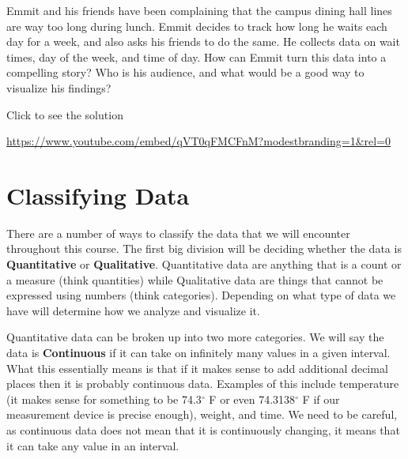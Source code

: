 \documentclass[
  letterpaper,
  DIV=11,
  numbers=noendperiod]{scrreprt}
\begin{document}
\begin{tcolorbox}[enhanced jigsaw, leftrule=.75mm, arc=.35mm, coltitle=black, rightrule=.15mm, bottomrule=.15mm, toprule=.15mm, left=2mm, colbacktitle=quarto-callout-tip-color!10!white, title=\textcolor{quarto-callout-tip-color}{\faLightbulb}\hspace{0.5em}{Try it Out}, toptitle=1mm, breakable, colframe=quarto-callout-tip-color-frame, bottomtitle=1mm, titlerule=0mm, colback=white, opacityback=0, opacitybacktitle=0.6]

Emmit and his friends have been complaining that the campus dining hall
lines are way too long during lunch. Emmit decides to track how long he
waits each day for a week, and also asks his friends to do the same. He
collects data on wait times, day of the week, and time of day. How can
Emmit turn this data into a compelling story? Who is his audience, and
what would be a good way to visualize his findings?

Click to see the solution

\url{https://www.youtube.com/embed/qVT0qFMCFnM?modestbranding=1&rel=0}

\end{tcolorbox}

\section{Classifying Data}\label{classifying-data}

There are a number of ways to classify the data that we will encounter
throughout this course. The first big division will be deciding whether
the data is \textbf{Quantitative} or \textbf{Qualitative}. Quantitative
data are anything that is a count or a measure (think quantities) while
Qualitative data are things that cannot be expressed using numbers
(think categories). Depending on what type of data we have will
determine how we analyze and visualize it.

Quantitative data can be broken up into two more categories. We will say
the data is \textbf{Continuous} if it can take on infinitely many values
in a given interval. What this essentially means is that if it makes
sense to add additional decimal places then it is probably continuous
data. Examples of this include temperature (it makes sense for something
to be 74.3\(^\circ\) F or even 74.3138\(^\circ\) F if our measurement
device is precise enough), weight, and time. We need to be careful, as
continuous data does not mean that it is continuously changing, it means
that it can take any value in an interval.
\end{document}
